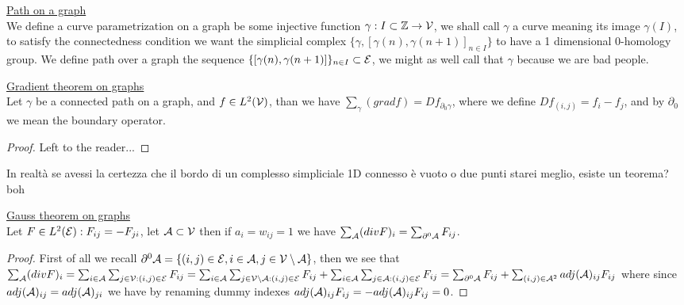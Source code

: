 \documentclass[../main.tex]{subfiles}
\begin{document}
\begin{defn}
    \underline{Path on a graph}\\
    We define a curve parametrization on a graph be some injective function $ \gamma : I \subset \mathbb{Z} \to \mathcal{V}$, we shall call $\gamma$ 
    a curve meaning its image $\gamma(I)$, to satisfy the connectedness condition we want the simplicial complex $\{ \gamma,[\gamma(n),\gamma(n+1)]_{n \in I} \}$
    to have a 1 dimensional 0-homology group. We define path over a graph the sequence $\{ [\gamma(n),\gamma(n+1)] \}_{n \in I} \subset \mathcal{E}$, we
    might as well call that $\gamma$ because we are bad people.
\end{defn}

\begin{thm}
    \underline{Gradient theorem on graphs}\\
    Let $\gamma$ be a connected path on a graph, and $f \in L^2(\mathcal{V})$, than we have $\sum_\gamma (gradf) = Df_{\partial_0 \gamma}$,
    where we define $Df_{(i,j)} = f_i - f_j$, and by $\partial_0$ we mean the boundary operator.
\end{thm}
\begin{proof}
    Left to the reader...
\end{proof}

In realtà se avessi la certezza che il bordo di un complesso simpliciale 1D connesso è vuoto o due punti starei meglio, esiste un teorema? boh

\begin{thm}
    \underline{Gauss theorem on graphs}\\
    Let $F \in L^2(\mathcal{E}) : F_{ij}=-F_{ji}$, let $\mathcal{A} \subset \mathcal{V}$ then if $a_i = w_{ij} = 1$ we have
    $\sum_{\mathcal{A}} (divF)_i = \sum_{\partial^0 \mathcal{A}} F_{ij}$.
\end{thm}
\begin{proof}
    First of all we recall $\partial^0 \mathcal{A} = \{ (i,j) \in \mathcal{E}, i \in \mathcal{A}, j \in \mathcal{V \setminus A} \}$, then we see that
    $\sum_{\mathcal{A}} (divF)_i = \sum_{i \in \mathcal{A}}\sum_{j \in \mathcal{V} : (i,j) \in \mathcal{E}} F_{ij} =
    \sum_{i \in \mathcal{A}}\sum_{j \in \mathcal{V \setminus A} : (i,j) \in \mathcal{E}} F_{ij} +
    \sum_{i \in \mathcal{A}}\sum_{j \in \mathcal{A} : (i,j) \in \mathcal{E}} F_{ij} = \sum_{\partial^0 \mathcal{A}} F_{ij} + \sum_{(i,j) \in \mathcal{A}^2} adj(\mathcal{A})_{ij} F_{ij}$
    where since $adj(\mathcal{A})_{ij} = adj(\mathcal{A})_{ji}$ we have by renaming dummy indexes $adj(\mathcal{A})_{ij} F_{ij} = -adj(\mathcal{A})_{ij} F_{ij} = 0$.
\end{proof}
\end{document}
